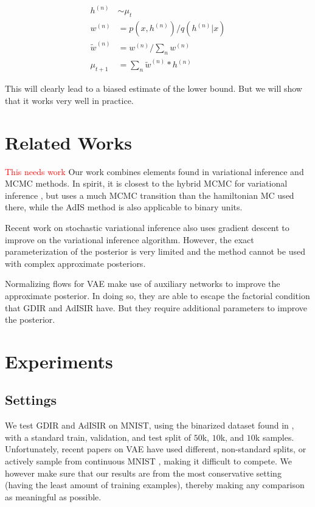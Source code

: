 \documentclass{article} %
\newcommand{\alert}[1]{\textcolor{red}{#1}}
\begin{document}
\begin{align}
h^{(n)} &\sim \mu_t \nonumber \\
w^{(n)} &= p(x, h^{(n)}) / q(h^{(n)} | x) \nonumber \\
\tilde{w}^{(n)} &= w^{(n)} / \sum_n w^{(n)} \nonumber \\
\mu_{t+1} &= \sum_n \tilde{w}^{(n)} * h^{(n)}
\end{align}

This will clearly lead to a biased estimate of the lower bound. But we will show that it works very well in practice.

\section{Related Works}
\alert{This needs work}
Our work combines elements found in variational inference and MCMC methods. In spirit, it is closest to the hybrid MCMC for variational inference \citep{salimans2014markov}, but uses a much MCMC transition than the hamiltonian MC used there, while the AdIS method is also applicable to binary units.

Recent work on stochastic variational inference \cite{hoffman2013stochastic} also uses gradient descent to improve on the variational inference algorithm. However, the exact parameterization of the posterior is very limited and the method cannot be used with complex approximate posteriors. 

Normalizing flows for VAE \citep{rezende2015variational} make use of auxiliary networks to improve the approximate posterior. In doing so, they are able to escape the factorial condition that GDIR and AdISIR have. But they require additional parameters to improve the posterior.

\section{Experiments}

\subsection{Settings}

We test GDIR and AdISIR on MNIST, using the binarized dataset found in \citep{salakhutdinov2008quantitative}, with a standard train, validation, and test split of $50$k, $10$k, and $10$k samples. Unfortunately, recent papers on VAE \citep{mnih2014neural, salimans2014markov} have used different, non-standard splits, or actively sample from continuous MNIST \citep{burda2015importance}, making it difficult to compete. We however make sure that our results are from the most conservative setting (having the least amount of training examples), thereby making any comparison as meaningful as possible.
\end{document}
